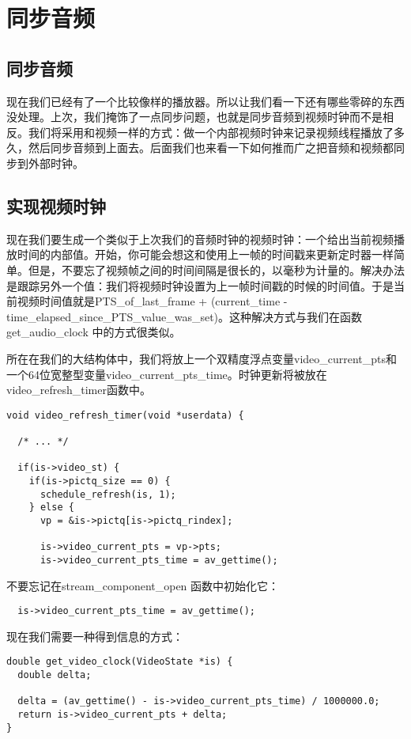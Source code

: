 ﻿\chapter{同步音频}
\label{ch6}
\section{同步音频}
现在我们已经有了一个比较像样的播放器。所以让我们看一下还有哪些零碎的东西没处理。上次，我们掩饰了一点同步问题，也就是同步音频到视频时钟而不是相反。我们将采用和视频一样的方式：做一个内部视频时钟来记录视频线程播放了多久，然后同步音频到上面去。后面我们也来看一下如何推而广之把音频和视频都同步到外部时钟。
\section{实现视频时钟}
现在我们要生成一个类似于上次我们的音频时钟的视频时钟：一个给出当前视频播放时间的内部值。开始，你可能会想这和使用上一帧的时间戳来更新定时器一样简单。但是，不要忘了视频帧之间的时间间隔是很长的，以毫秒为计量的。解决办法是跟踪另外一个值：我们将视频时钟设置为上一帧时间戳的时候的时间值。于是当前视频时间值就是PTS_of_last_frame + (current_time -time_elapsed_since_PTS_value_was_set)。这种解决方式与我们在函数get_audio_clock 中的方式很类似。

所在在我们的大结构体中，我们将放上一个双精度浮点变量video_current_pts和一个64位宽整型变量video_current_pts_time。时钟更新将被放在video_refresh_timer函数中。

\begin{lstlisting}
void video_refresh_timer(void *userdata) {

  /* ... */

  if(is->video_st) {
    if(is->pictq_size == 0) {
      schedule_refresh(is, 1);
    } else {
      vp = &is->pictq[is->pictq_rindex];

      is->video_current_pts = vp->pts;
      is->video_current_pts_time = av_gettime();
\end{lstlisting}
不要忘记在stream_component_open 函数中初始化它：
\begin{lstlisting}
  is->video_current_pts_time = av_gettime();
\end{lstlisting}
现在我们需要一种得到信息的方式：
\begin{lstlisting}
double get_video_clock(VideoState *is) {
  double delta;

  delta = (av_gettime() - is->video_current_pts_time) / 1000000.0;
  return is->video_current_pts + delta;
}
\end{lstlisting}
